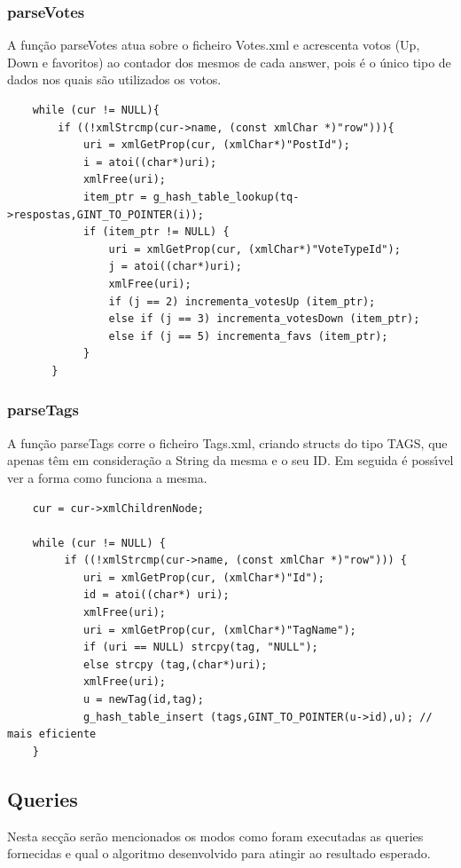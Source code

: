 \documentclass{article}
\begin{document}
\subsubsection{parseVotes}
\par A fun\c{c}\~{a}o parseVotes atua sobre o ficheiro Votes.xml e acrescenta votos (Up, Down e favoritos) ao contador dos mesmos de cada answer, pois \'{e} o \'{u}nico tipo de dados nos quais s\~{a}o utilizados os votos.   

\begin{lstlisting}
    while (cur != NULL){
        if ((!xmlStrcmp(cur->name, (const xmlChar *)"row"))){
	    	uri = xmlGetProp(cur, (xmlChar*)"PostId");
	    	i = atoi((char*)uri);
	    	xmlFree(uri);
	    	item_ptr = g_hash_table_lookup(tq->respostas,GINT_TO_POINTER(i));
	    	if (item_ptr != NULL) {
	    		uri = xmlGetProp(cur, (xmlChar*)"VoteTypeId");
            	j = atoi((char*)uri);
            	xmlFree(uri);
	        	if (j == 2) incrementa_votesUp (item_ptr);
            	else if (j == 3) incrementa_votesDown (item_ptr);
            	else if (j == 5) incrementa_favs (item_ptr);
          	}      
       }
\end{lstlisting}

\subsubsection{parseTags}
\par A fun\c{c}\~{a}o parseTags corre o ficheiro Tags.xml, criando structs do tipo TAGS, que apenas t\^{e}m em considera\c{c}\~{a}o a String da mesma e o seu ID. Em seguida \'{e} poss\'{\i}vel ver a forma como funciona a mesma.

\begin{lstlisting}
    cur = cur->xmlChildrenNode;
    
    while (cur != NULL) {
         if ((!xmlStrcmp(cur->name, (const xmlChar *)"row"))) {
            uri = xmlGetProp(cur, (xmlChar*)"Id");
            id = atoi((char*) uri);
            xmlFree(uri);
            uri = xmlGetProp(cur, (xmlChar*)"TagName");
            if (uri == NULL) strcpy(tag, "NULL");
            else strcpy (tag,(char*)uri);
            xmlFree(uri); 
            u = newTag(id,tag);
            g_hash_table_insert (tags,GINT_TO_POINTER(u->id),u); // mais eficiente	
	}
\end{lstlisting}




\subsection{Queries}
\par Nesta sec\c{c}\~{a}o ser\~{a}o mencionados os modos como foram executadas as queries fornecidas e qual o algoritmo desenvolvido para atingir ao resultado esperado. 
\end{document}
